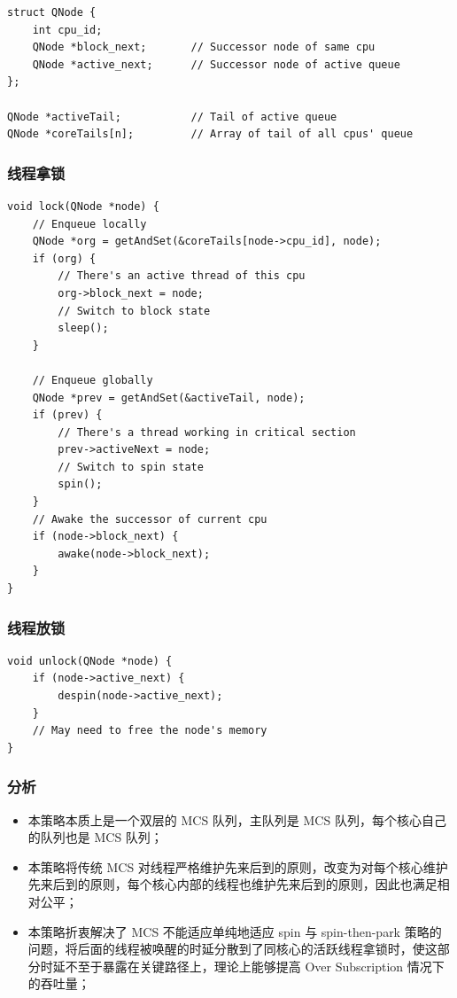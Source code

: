 \documentclass[UTF8]{ctexart}
\begin{document}
\begin{lstlisting}
struct QNode {
    int cpu_id;
    QNode *block_next;       // Successor node of same cpu
    QNode *active_next;      // Successor node of active queue
};

QNode *activeTail;           // Tail of active queue
QNode *coreTails[n];         // Array of tail of all cpus' queue
\end{lstlisting}

\subsubsection{线程拿锁}

\begin{lstlisting}
void lock(QNode *node) {
    // Enqueue locally
    QNode *org = getAndSet(&coreTails[node->cpu_id], node);
    if (org) {
        // There's an active thread of this cpu
        org->block_next = node;
        // Switch to block state
        sleep();
    }

    // Enqueue globally
    QNode *prev = getAndSet(&activeTail, node);
    if (prev) {
        // There's a thread working in critical section
        prev->activeNext = node;
        // Switch to spin state
        spin();
    }
    // Awake the successor of current cpu
    if (node->block_next) {
        awake(node->block_next);
    }
}
\end{lstlisting}

\newpage

\subsubsection{线程放锁}

\begin{lstlisting}
void unlock(QNode *node) {
    if (node->active_next) {
        despin(node->active_next);
    }
    // May need to free the node's memory
}
\end{lstlisting}

\subsubsection{分析}

\begin{itemize}
    \item 本策略本质上是一个双层的 MCS 队列，主队列是 MCS 队列，每个核心自己的队列也是 MCS 队列；
    \item 本策略将传统 MCS 对线程严格维护先来后到的原则，改变为对每个核心维护先来后到的原则，每个核心内部的线程也维护先来后到的原则，因此也满足相对公平；
    \item 本策略折衷解决了 MCS 不能适应单纯地适应 spin 与 spin-then-park 策略的问题，将后面的线程被唤醒的时延分散到了同核心的活跃线程拿锁时，使这部分时延不至于暴露在关键路径上，理论上能够提高 Over Subscription 情况下的吞吐量；
\end{itemize}
\end{document}
